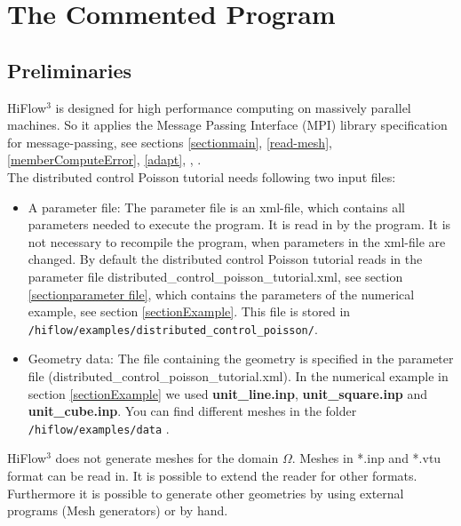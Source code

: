 \documentclass[a4paper, 11pt, twoside]{article}
\begin{document}
\section{The Commented Program}
\subsection{Preliminaries}
HiFlow$^3$ is designed for high performance computing on massively parallel machines. 
So it applies the Message Passing Interface (MPI) library specification for message-passing, see sections \ref{sectionmain}, \ref{read-mesh}, \ref{memberComputeError}, \ref{adapt}, \cite{MPI}, \cite{MPIstandard} .\\
The distributed control Poisson tutorial needs following two input files:
\begin{itemize}
\item A parameter file: The parameter file is an xml-file, which contains all parameters needed to execute the program. It is read in by the program. It is not necessary to recompile the program, when parameters in the xml-file are changed. By default the distributed control Poisson tutorial reads in the parameter file distributed\_control\_poisson\_tutorial.xml, see section \ref{sectionparameter file}, which contains the parameters of the numerical example, see section \ref{sectionExample}. This file is stored in \verb'/hiflow/examples/distributed_control_poisson/'.  
\item Geometry data: The file containing the geometry is specified in the parameter file (distributed\_control\_poisson\_tutorial.xml). In the numerical example in section \ref{sectionExample} we used \textbf{unit\_line.inp}, \textbf{unit\_square.inp} and \textbf{unit\_cube.inp}. You can find different meshes in the folder \verb'/hiflow/examples/data' .
\end{itemize}

HiFlow$^3$ does not generate meshes for the domain $\Omega$. Meshes in *.inp and *.vtu format can be read in. 
It is possible to extend the reader for other formats.
Furthermore it is possible to generate other geometries by using external programs (Mesh generators) or by hand.\\  
\end{document}

